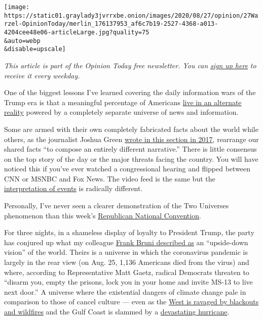 \texttt{[image: https://static01.graylady3jvrrxbe.onion/images/2020/08/27/opinion/27Warzel-OpinionToday/merlin\_176137953\_af6c7b19-2527-4368-a013-4204cee48e06-articleLarge.jpg?quality=75\\\&auto=webp\\\&disable=upscale]}

\emph{This article is part of the Opinion Today free newsletter. You
can}
\href{https://www.nytimes3xbfgragh.onion/newsletters/opinion-todaynl}{\emph{sign
up here}} \emph{to receive it every weekday.}

One of the biggest lessons I've learned covering the daily information
wars of the Trump era is that a meaningful percentage of Americans
\href{https://www.buzzfeednews.com/article/charliewarzel/2017-year-the-internet-destroyed-shared-reality}{live
in an alternate reality} powered by a completely separate universe of
news and information.

Some are armed with their own completely fabricated facts about the
world while others, as the journalist Joshua Green
\href{https://www.nytimes3xbfgragh.onion/2017/07/15/opinion/sunday/no-one-cares-about-russia-in-the-world-breitbart-made.html}{wrote
in this section in 2017}, rearrange our shared facts ``to compose an
entirely different narrative.'' There is little consensus on the top
story of the day or the major threats facing the country. You will have
noticed this if you've ever watched a congressional hearing and flipped
between CNN or MSNBC and Fox News. The video feed is the same but the
\href{https://twitter.com/oliverdarcy/status/872848804977836033?ref_src=twsrc\%5Etfw\%7Ctwcamp\%5Etweetembed\%7Ctwterm\%5E872848804977836033\%7Ctwgr\%5E\&ref_url=https\%3A\%2F\%2Fwww.buzzfeednews.com\%2Farticle\%2Fcharliewarzel\%2F2017-year-the-internet-destroyed-shared-reality}{interpretation
of events} is radically different.

Personally, I've never seen a clearer demonstration of the Two Universes
phenomenon than this week's
\href{https://www.nytimes3xbfgragh.onion/live/2020/08/27/us/rnc-convention-election}{Republican
National Convention}.

For three nights, in a shameless display of loyalty to President Trump,
the party has conjured up what my colleague
\href{https://www.nytimes3xbfgragh.onion/2020/08/26/opinion/trump-melania-rnc.html?action=click\&module=Opinion\&pgtype=Homepage}{Frank
Bruni described as} an ``upside-down vision'' of the world. Theirs is a
universe in which the coronavirus pandemic is largely in the rear view
(on Aug. 25, 1,136 Americans died from the virus) and where, according
to Representative Matt Gaetz, radical Democrats threaten to ``disarm
you, empty the prisons, lock you in your home and invite MS-13 to live
next door.'' A universe where the existential dangers of climate change
pale in comparison to those of cancel culture --- even as the
\href{https://www.nytimes3xbfgragh.onion/2020/08/26/opinion/california-wildfires-blackouts.html?action=click\&module=Opinion\&pgtype=Homepage}{West
is ravaged by blackouts and wildfires} and the Gulf Coast is slammed by
a
\href{https://www.nytimes3xbfgragh.onion/2020/08/27/us/hurricane-laura-update.html?action=click\&module=Top\%20Stories\&pgtype=Homepage}{devastating
hurricane}.

